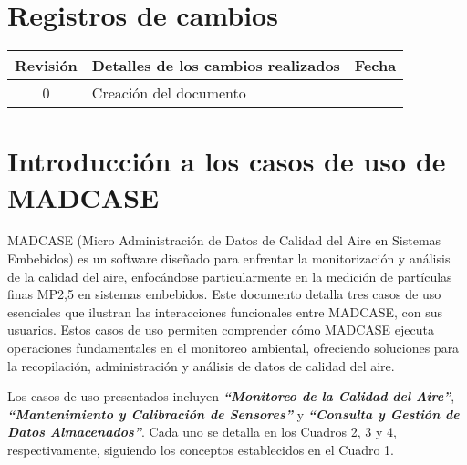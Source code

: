 \documentclass[
11pt, %
codirector, %
]{charter}
\begin{document}
\maketitle

\newpage

\section*{Registros de cambios}
\label{sec:registro}


\begin{table}[ht]
	\label{tab:registro}
	\centering
	\begin{tabularx}{\linewidth}{@{}|c|X|c|@{}}
		\hline
		\rowcolor[HTML]{C0C0C0} 
		Revisión & \multicolumn{1}{c|}{\cellcolor[HTML]{C0C0C0}Detalles de los cambios realizados} & Fecha      \\ \hline
		0      & Creación del documento                                 &\fechaInicioName \\ \hline
		\hline
		
	\end{tabularx}
	\label{sec:cierre}
\end{table}

\pagebreak


\section{Introducción a los casos de uso de MADCASE}
\label{sec:org60390fa}



MADCASE (Micro Administración de Datos de Calidad del Aire en Sistemas Embebidos) es un software diseñado para enfrentar  la monitorización y análisis de la calidad del aire, enfocándose particularmente en la medición de partículas finas MP2,5 en sistemas embebidos. Este documento detalla tres casos de uso esenciales que ilustran las interacciones funcionales entre MADCASE, con sus usuarios. Estos casos de uso permiten comprender cómo MADCASE ejecuta operaciones fundamentales en el monitoreo ambiental, ofreciendo soluciones para la recopilación, administración y análisis de datos de calidad del aire.

Los casos de uso presentados incluyen \textbf{\textit{``Monitoreo de la Calidad del Aire''}}, \textbf{\textit{``Mantenimiento y Calibración de Sensores''}} y \textbf{\textit{``Consulta y Gestión de Datos Almacenados''}}. Cada uno se detalla en los Cuadros 2, 3 y 4, respectivamente, siguiendo los conceptos establecidos en el Cuadro 1.
\end{document}

